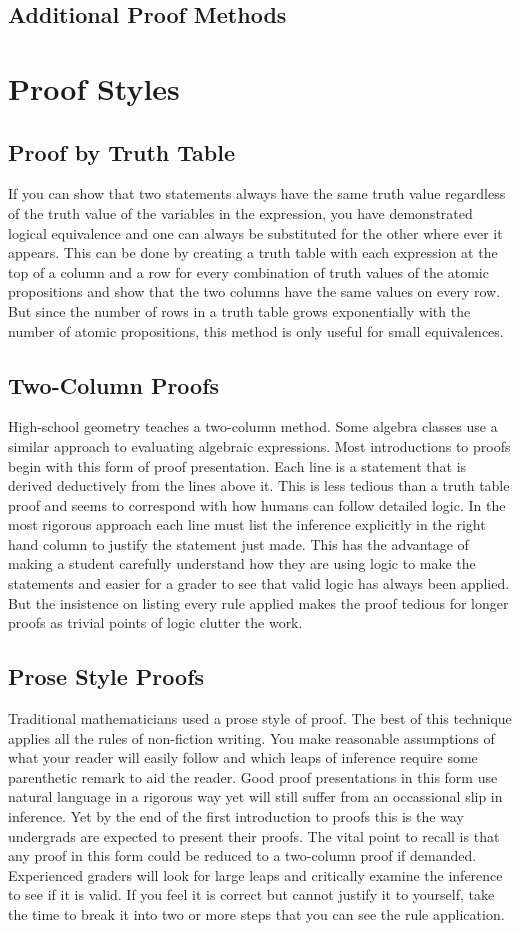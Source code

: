     \subsection {Additional Proof Methods}


\section{Proof Styles}
  \subsection{Proof by Truth Table}
If you can show that two statements always have the same truth value regardless of the truth value of the variables in the expression, you have demonstrated logical equivalence and one can always be substituted for the other where ever it appears. This can be done by creating a truth table with each expression at the top of a column and a row for every combination of truth values of the atomic propositions and show that the two columns have the same values on every row. But since the number of rows in a truth table grows exponentially with the number of atomic propositions, this method is only useful for small equivalences.
  \subsection{Two-Column Proofs}
High-school geometry teaches a two-column method. Some algebra classes use a similar approach to evaluating algebraic expressions. Most introductions to proofs begin with this form of proof presentation. Each line is a statement that is derived deductively from the lines above it. This is less tedious than a truth table proof and seems to correspond with how humans can follow detailed logic. In the most rigorous approach each line must list the inference explicitly in the right hand column to justify the statement just made. This has the advantage of making a student carefully understand how they are using logic to make the statements and easier for a grader to see that valid logic has always been applied. But the insistence on listing every rule applied makes the proof tedious for longer proofs as trivial points of logic clutter the work.
  \subsection{Prose Style Proofs}
Traditional mathematicians used a prose style of proof. The best of this technique applies all the rules of non-fiction writing. You make reasonable assumptions of what your reader will easily follow and which leaps of inference require some parenthetic remark to aid the reader. Good proof presentations in this form use natural language in a rigorous way yet will still suffer from an occassional slip  in inference. Yet by the end of the first introduction to proofs this is the way undergrads are expected to present their proofs. The vital point to recall is that any proof in this form could be reduced to a two-column proof if demanded. Experienced graders will look for large leaps and critically examine the inference to see if it is valid. If you feel it is correct but cannot justify it to yourself, take the time to break it into two or more steps that you can see the rule application.
